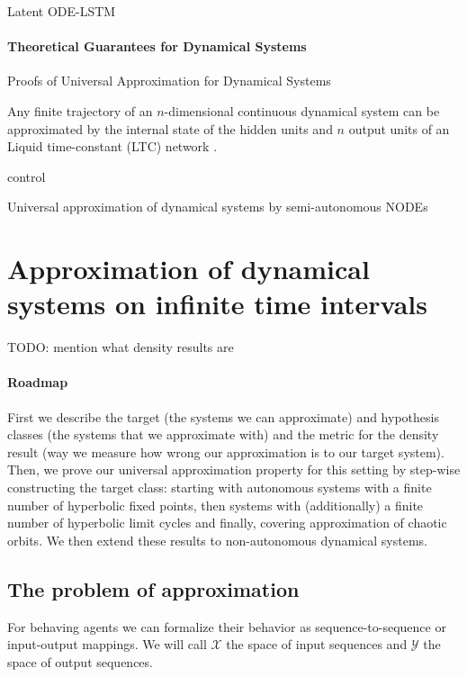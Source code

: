 \documentclass{article}
\theoremstyle{definition}
\theoremstyle{remark}
\begin{document}
Latent ODE-LSTM \citep{coelho2024enhancing}


\paragraph{Theoretical Guarantees for Dynamical Systems}
 Proofs of Universal Approximation for Dynamical Systems
 
 Any finite trajectory of an $n$-dimensional continuous dynamical system can be approximated by the internal state of the hidden units and $n$ output units of an Liquid time-constant (LTC) network \citep{hasani2018liquid}.
 
control \citep{tabuada2020universal}

\citep{zhang2020approximation}

\citep{li2022deep}

Universal approximation of dynamical systems by semi-autonomous NODEs \citep{li2024universal}








\section{Approximation of dynamical systems on infinite time intervals}

TODO: mention what density results are

\paragraph{Roadmap}
First we describe the target (the systems we can approximate) and hypothesis classes (the systems that we approximate with) and the metric for the density result (way we measure how wrong our approximation is to our target system).
Then, we prove our universal approximation property for this setting by step-wise constructing the target class:
starting with autonomous systems with a finite number of hyperbolic fixed points,
then systems with (additionally) a finite number of hyperbolic limit cycles
and finally, covering approximation of chaotic orbits.
We then extend these results to non-autonomous dynamical systems.



\subsection{The problem of approximation} %
For behaving agents we can formalize their behavior as sequence-to-sequence or input-output mappings.
We will call $\mathcal{X}$ the space of input sequences and $\mathcal{Y}$ the space of output sequences.
\end{document}
